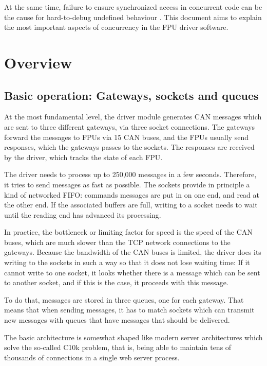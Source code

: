 \documentclass[fontsize=12,a4paper]{scrartcl}
\begin{document}
At the same time, failure to ensure synchronized access in concurrent
code can be the cause for hard-to-debug undefined behaviour
\cite{Regehr:AGtUBPt3}\cite{MeyersAlexandrescu:2004:DCL}\cite[p
  218-225]{Love:2013:LSP}. This document aims to explain the most
important aspects of concurrency in the FPU driver software.

\section{Overview}

\subsection{Basic operation: Gateways, sockets and queues}

At the most fundamental level, the driver module generates CAN
messages which are sent to three different gateways, via three socket
connections\cite[chapters 56-61]{Kerrisk:TLPI}. The gateways forward
the messages to FPUs via 15 CAN buses, and the FPUs usually send
responses, which the gateways passes to the sockets. The responses are
received by the driver, which tracks the state of each FPU.

The driver needs to process up to 250,000 messages in a few seconds.
Therefore, it tries to send messages as fast as possible. The sockets
provide in principle a kind of networked FIFO: commands messages are
put in on one end, and read at the other end. If the associated
buffers are full, writing to a socket needs to wait until the reading
end has advanced its processing.

In practice, the bottleneck or limiting factor for speed is the speed
of the CAN buses, which are much slower than the TCP network
connections to the gateways. Because the bandwidth of the CAN buses
is limited, the driver does its writing to the sockets in such a way
so that it does not lose waiting time: If it cannot write to one
socket, it looks whether there is a message which can be sent to
another socket, and if this is the case, it proceeds with this
message.

To do that, messages are stored in three queues, one for each
gateway. That means that when sending messages, it has to match
sockets which can transmit new messages with queues that have messages
that should be delivered.

The basic architecture is somewhat shaped like modern server
architectures which solve the so-called C10k problem, that is, being
able to maintain tens of thousands of connections in a single web
server process\cite{Kegel:C10kProblem}\cite{WP:C10kProblem}.
\end{document}
